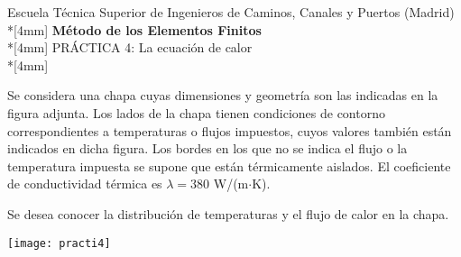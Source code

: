 \documentclass[a4paper,12pt]{article}
\begin{document}
\mbox{}\vspace*{-45mm}

{\centering
{\small\sc Escuela Técnica Superior de Ingenieros de Caminos, Canales y
Puertos (Madrid)}\\*[4mm]
{\Large\bf Método de los Elementos Finitos}\\*[4mm]
PRÁCTICA 4: La ecuación de calor \\*[4mm]
}

\vspace{3mm}

\parbox{70mm}{ 
Se considera una chapa cuyas dimensiones y geometría son las indicadas
en la figura adjunta. Los lados de la chapa tienen condiciones de contorno 
correspondientes a temperaturas o flujos impuestos, cuyos valores
también están indicados en dicha figura. Los bordes en los que no se indica
el flujo o la temperatura impuesta se supone que están térmicamente aislados.
El coeficiente de conductividad térmica es $\lambda=380$ W/(m$\cdot$K).

Se desea conocer la distribución de temperaturas y el flujo de calor en la
chapa.
} \hfill
\parbox{80mm}{
\texttt{[image: practi4]}
}
\end{document}
